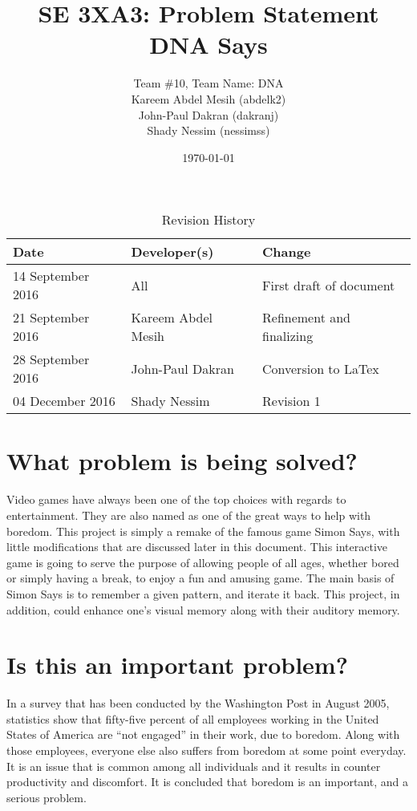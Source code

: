 \documentclass{article}
\title{SE 3XA3: Problem Statement \\DNA Says}
\author{Team \#10, Team Name: DNA
		\\ Kareem Abdel Mesih (abdelk2)
		\\ John-Paul Dakran (dakranj)
		\\ Shady Nessim (nessimss)
}
\date{\today}
\begin{document}
\maketitle
{}

\newpage

\tableofcontents
\listoftables


\begin{table}[hp]
\caption{Revision History} \label{TblRevisionHistory}
\begin{tabularx}{\textwidth}{llX}
\toprule
\textbf{Date} & \textbf{Developer(s)} & \textbf{Change}\\
\midrule
14 September 2016 & All & First draft of document\\
21 September 2016 & Kareem Abdel Mesih & Refinement and finalizing\\
28 September 2016 & John-Paul Dakran & Conversion to LaTex\\
04 December  2016 & Shady Nessim & Revision 1\\
\bottomrule
\end{tabularx}
\end{table}

\newpage
\section{What problem is being solved?}
\par Video games have always been one of the top choices with regards to entertainment. They are also named as one of the great ways to help with boredom. This project is simply a remake of the famous game Simon Says, with little modifications that are discussed later in this document. This interactive game is going to serve the purpose of allowing people of all ages, whether bored or simply having a break, to enjoy a fun and amusing game. The main basis of Simon Says is to remember a given pattern, and iterate it back. This project, in addition, could enhance one’s visual memory along with their auditory memory.

\section{Is this an important problem?}

\par In a survey that has been conducted by the Washington Post in August 2005, statistics show that fifty-five percent of all employees working in the United States of America are “not engaged” in their work, due to boredom. Along with those employees, everyone else also suffers from boredom at some point everyday. It is an issue that is common among all individuals and it results in counter productivity and discomfort. It is concluded that boredom is an important, and a serious problem.
\end{document}
